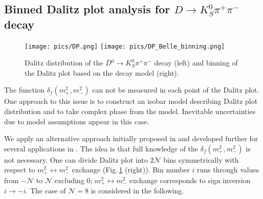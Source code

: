\documentclass[preprint,aps,showpacs]{revtex4}
\newcommand{\dkpp}{\ensuremath{D\to K^0_S\pi^+\pi^-}\xspace}
\newcommand{\dbkpp}{\ensuremath{\overline{D}{}^0\to K^0_S\pi^+\pi^-}\xspace}
\begin{document}
\subsection{Binned Dalitz plot analysis for \dkpp decay}
\begin{figure}[htb]
\texttt{[image: pics/DP.png]}
\texttt{[image: pics/DP\_Belle\_binning.png]}
\caption{Dalitz distribution of the \dbkpp decay (left) and binning of the Dalitz plot based on the decay model (right).}
\label{fig:DP}
\end{figure}

The function $\delta_f(m^2_+,m^2_-)$ can not be measured in each point of the Dalitz plot. One approach to this issue is to construct an isobar model describing Dalitz plot distribution and to take complex phase from the model. Inevitable uncertainties due to model assumptions appear in this case.

We apply an alternative approach initially proposed in \cite{GGSZ} and developed further for several applications in \cite{BP_phi3_model_ind1,BP_phi3_model_ind2,BPV}. The idea is that full knowledge of the $\delta_f(m^2_+,m^2_-)$ is not necessary. One can divide Dalitz plot into $2\mathcal{N}$ bins symmetrically with respect to $m_+^2 \leftrightarrow m_-^2$ exchange (Fig.\,\ref{fig:DP} (right)). Bin number $i$ runs through values from $-\mathcal{N}$ to $\mathcal{N}$ excluding $0$; $m_+^2 \leftrightarrow m_-^2$ exchange corresponds to sign inversion $i \to -i$. The case of $\mathcal{N}=8$ is considered in the following.
\end{document}
